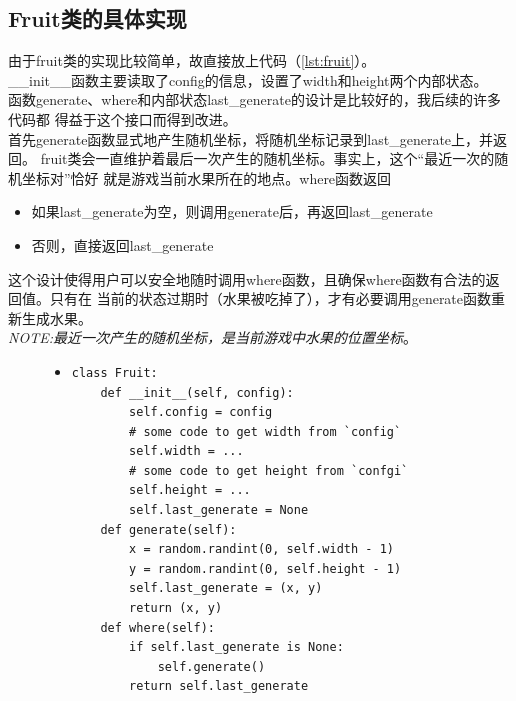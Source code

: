 \documentclass[a4paper]{article}
\begin{document}
\subsection{Fruit类的具体实现}
由于fruit类的实现比较简单，故直接放上代码（\autoref{lst:fruit}）。\\

\_\_init\_\_函数主要读取了config的信息，设置了width和height两个内部状态。\\

函数generate、where和内部状态last\_generate的设计是比较好的，我后续的许多代码都
得益于这个接口而得到改进。\\

首先generate函数显式地产生随机坐标，将随机坐标记录到last\_generate上，并返回。
fruit类会一直维护着最后一次产生的随机坐标。事实上，这个``最近一次的随机坐标对''恰好
就是游戏当前水果所在的地点。where函数返回
\begin{itemize}
    \item 如果last\_generate为空，则调用generate后，再返回last\_generate 
    \item 否则，直接返回last\_generate
\end{itemize}
这个设计使得用户可以安全地随时调用where函数，且确保where函数有合法的返回值。只有在
当前的状态过期时（水果被吃掉了），才有必要调用generate函数重新生成水果。\\

\emph{NOTE:最近一次产生的随机坐标，是当前游戏中水果的位置坐标}。



\begin{figure}[!hbt]
\begin{itemize}
\item[] \begin{lstlisting}[style=mypython, label=lst:fruit, caption=fruit类的具体实现]
class Fruit:
    def __init__(self, config):
        self.config = config
        # some code to get width from `config`
        self.width = ... 
        # some code to get height from `confgi`
        self.height = ... 
        self.last_generate = None
    def generate(self):
        x = random.randint(0, self.width - 1)
        y = random.randint(0, self.height - 1)
        self.last_generate = (x, y)
        return (x, y)
    def where(self):
        if self.last_generate is None:
            self.generate()
        return self.last_generate
\end{lstlisting}
\end{itemize}
\end{figure}
\end{document}
